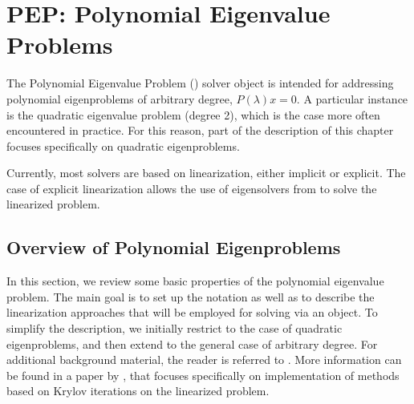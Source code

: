 \chapter{\label{cap:pep}PEP: Polynomial Eigenvalue Problems}


\noindent The Polynomial Eigenvalue Problem () solver object is intended for addressing polynomial eigenproblems of arbitrary degree, $P(\lambda)x=0$. A particular instance is the quadratic eigenvalue problem (degree 2), which is the case more often encountered in practice. For this reason, part of the description of this chapter focuses specifically on quadratic eigenproblems.

Currently, most  solvers are based on linearization, either implicit or explicit. The case of explicit linearization allows the use of eigensolvers from  to solve the linearized problem.

\section{\label{sec:pep}Overview of Polynomial Eigenproblems}

In this section, we review some basic properties of the polynomial eigenvalue problem. The main goal is to set up the notation as well as to describe the linearization approaches that will be employed for solving via an  object.
To simplify the description, we initially restrict to the case of quadratic eigenproblems, and then extend to the general case of arbitrary degree.
For additional background material, the reader is referred to \citep{Tisseur:2001:QEP}. More information can be found in a paper by \cite{Campos:2016:PKS}, that focuses specifically on \slepc implementation of methods based on Krylov iterations on the linearized problem.

